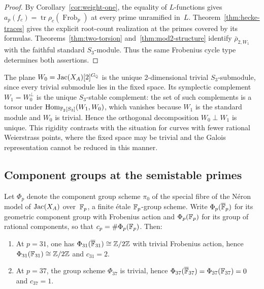 \begin{proof}
By Corollary~\ref{cor:weight-one}, the equality of \(L\)-functions gives \(a_p(f_c)=\operatorname{tr}\rho_c(\operatorname{Frob}_p)\) at every prime unramified in~\(L\). Theorem~\ref{thm:hecke-traces} gives the explicit root-count realization at the primes covered by its formulas. Theorems~\ref{thm:two-torsion} and~\ref{thm:mod2-structure} identify \(\bar\rho_{2,W_1}\) with the faithful standard \(S_3\)-module. Thus the same Frobenius cycle type determines both assertions.
\end{proof}

\begin{remark}\label{rem:hyperbolic-splitting}
The plane \(W_0=\operatorname{Jac}(X_A)[2]^{G_{\mathbb{Q}}}\) is the unique \(2\)-dimensional trivial \(S_3\)-submodule, since every trivial submodule lies in the fixed space. Its symplectic complement \(W_1=W_0^\perp\) is the unique \(S_3\)-stable complement: the set of such complements is a torsor under \(\operatorname{Hom}_{\mathbb{F}_2[S_3]}(W_1,W_0)\), which vanishes because \(W_1\) is the standard module and \(W_0\) is trivial. Hence the orthogonal decomposition \(W_0\perp W_1\) is unique. This rigidity contrasts with the situation for curves with fewer rational Weierstrass points, where the fixed space may be trivial and the Galois representation cannot be reduced in this manner.
\end{remark}

\subsection{Component groups at the semistable primes}

\begin{proposition}\label{prop:tamagawa}
Let \(\Phi_p\) denote the component group scheme \(\pi_0\) of the special fibre of the N\'eron model of \(\operatorname{Jac}(X_A)\) over~\(\mathbb{F}_p\), a finite \'etale \(\mathbb{F}_p\)-group scheme. Write \(\Phi_p(\overline{\mathbb{F}}_p)\) for its geometric component group with Frobenius action and \(\Phi_p(\mathbb{F}_p)\) for its group of rational components, so that \(c_p=\#\Phi_p(\mathbb{F}_p)\). Then:
\begin{enumerate}
\item[(i)] At \(p=31\), one has \(\Phi_{31}(\overline{\mathbb{F}}_{31})\cong\mathbb{Z}/2\mathbb{Z}\) with trivial Frobenius action, hence \(\Phi_{31}(\mathbb{F}_{31})\cong\mathbb{Z}/2\mathbb{Z}\) and \(c_{31}=2\).
\item[(ii)] At \(p=37\), the group scheme \(\Phi_{37}\) is trivial, hence \(\Phi_{37}(\overline{\mathbb{F}}_{37})=\Phi_{37}(\mathbb{F}_{37})=0\) and \(c_{37}=1\).
\end{enumerate}
\end{proposition}

